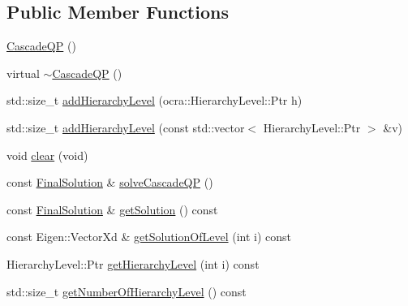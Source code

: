 \subsection*{Public Member Functions}
\begin{DoxyCompactItemize}
\item 
\hyperlink{classocra_1_1CascadeQP_a545a3098762becf8a663eb8ab3bd4899}{Cascade\+QP} ()
\item 
virtual \hyperlink{classocra_1_1CascadeQP_a843673d4951f7a8e972598d0f361ad8d}{$\sim$\+Cascade\+QP} ()
\item 
std\+::size\+\_\+t \hyperlink{classocra_1_1CascadeQP_ab1ac4edfcf8e8c7567fc0a5ca5bd5f86}{add\+Hierarchy\+Level} (ocra\+::\+Hierarchy\+Level\+::\+Ptr h)
\item 
std\+::size\+\_\+t \hyperlink{classocra_1_1CascadeQP_a6415299f7159a36a75940e073f64b770}{add\+Hierarchy\+Level} (const std\+::vector$<$ Hierarchy\+Level\+::\+Ptr $>$ \&v)
\item 
void \hyperlink{classocra_1_1CascadeQP_a476d6af7b355fd8a3887e9708253cd1a}{clear} (void)
\item 
const \hyperlink{structocra_1_1FinalSolution}{Final\+Solution} \& \hyperlink{classocra_1_1CascadeQP_a11e01b608414badd9af6794076eb8b33}{solve\+Cascade\+QP} ()
\item 
const \hyperlink{structocra_1_1FinalSolution}{Final\+Solution} \& \hyperlink{classocra_1_1CascadeQP_af59591ea0fdc81da5866fa3b99fd9d67}{get\+Solution} () const
\item 
const Eigen\+::\+Vector\+Xd \& \hyperlink{classocra_1_1CascadeQP_ab897ead27cb45e35281f39d389e8ed87}{get\+Solution\+Of\+Level} (int i) const
\item 
Hierarchy\+Level\+::\+Ptr \hyperlink{classocra_1_1CascadeQP_a49b3ce4ed68507905755b63f878c1990}{get\+Hierarchy\+Level} (int i) const
\item 
std\+::size\+\_\+t \hyperlink{classocra_1_1CascadeQP_a1f714b8b6024d46a4e9545324a21e702}{get\+Number\+Of\+Hierarchy\+Level} () const
\end{DoxyCompactItemize}
